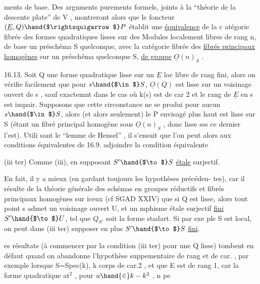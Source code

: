 
ments de base. Des arguments purements formels, joints à la
``théorie de la descente plate'' de  V  , montreront alors que le foncteur
$(\underline{E},Q) \hand{$\rightsquigarrow$} P$ établit une \uline{équivalence} de la c atégorie fibrée des formes
quadratiques lisses sur des Modules localement libres de rang n, de base
un préschéma S quelconque, avec la catégorie fibrée des \uline{fibrés principaux}
\uline{homogènes} sur un préschéma quelconque S, \uline{de groupe} $\underline{O}(n)_S$ .

16.13. Soit Q une forme quadratique lisse sur un $\underline{E}$ loc libre de
rang fini, alors on vérifie facilement que pour $s \hand{$\in$} S$, $\underline{O}(Q)$ est lisse
sur un voisinage ouvert de s ,  sauf exactemnt dans
le cas où k(s) est de car 2 et le rang de $\underline{E}$ en s est impair. Supposons
que cette circonstance ne se produi pour aucun $s \hand{$\in$} S$, alors (et alors
seulement) le P envisagé plus haut est lisse sur S (étant un fibré
principal homogène sous $\underline{O}(n)_S$ , donc lisse sss ce dernier l'est). Utili
sant le ``lemme de Hensel'' , il s'ensuit que  l'on peut alors aux
conditions équivalentes de 16.9. adjoindre la condition  équivalente

(iii ter)  Comme (iii), en supposant $S' \hand{$\to$} S$
\uline{étale} surjectif.

En fait, il y a mieux (en gardant toujours les hypothèses précéden-%
tes), car il résulte de la théorie générale des schémas en groupes réductifs
et fibrés principaux homogènes sur iceux (cf SGAD XXIV) que  si Q est
lisse, alors tout point s admet un voisinage ouvert U, et un mphisme
étale surjectif \uline{fini} $S' \hand{$\to$} U$, tel que $Q_{S'}$ soit la forme stadart. Si par exe
ple S est local, on peut dans (iii ter) supposer en plus $S' \hand{$\to$} S$ \uline{fini}.

 es résultats  (à commencer par la condition (iii ter) pour une Q
lisse)\hand{,} tombent en défaut quand on abandonne l'hypothèse suppementaire
de rang et de car. , par exemple lorsque S=Spec(k), k corps  de car.2 , et
que E est de rang 1, car la forme quadratique at$^{2}$ , pour $a\hand{\in} k - k^{2}$ , n pe

